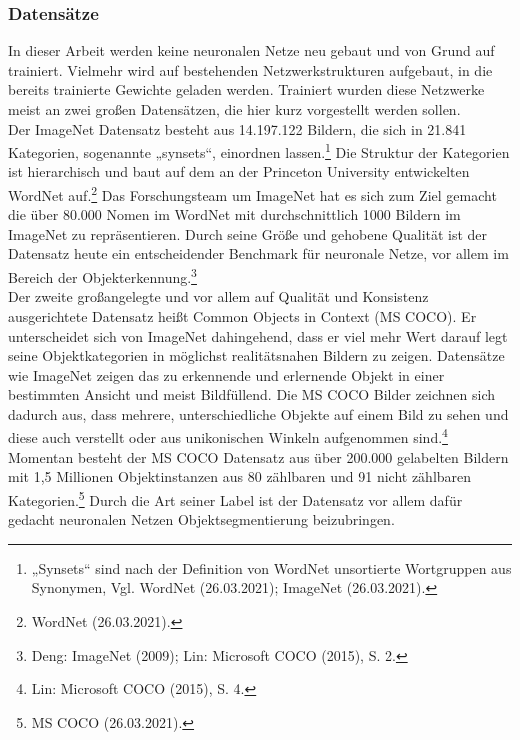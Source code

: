 \documentclass[a4paper,12pt,ngerman]{article}
\begin{document}
\subsubsection{Datensätze}
In dieser Arbeit werden keine neuronalen Netze neu gebaut und von Grund auf trainiert. Vielmehr wird auf bestehenden Netzwerkstrukturen aufgebaut, in die bereits trainierte Gewichte geladen werden. Trainiert wurden diese Netzwerke meist an zwei großen Datensätzen, die hier kurz vorgestellt werden sollen. \\
Der ImageNet Datensatz besteht aus 14.197.122 Bildern, die sich in 21.841 Kategorien, sogenannte „synsets“, einordnen lassen.\footnote{„Synsets“ sind nach der Definition von WordNet unsortierte Wortgruppen aus Synonymen, Vgl. WordNet (26.03.2021); ImageNet (26.03.2021).}  Die Struktur der Kategorien ist hierarchisch und baut auf dem an der Princeton University entwickelten WordNet auf.\footnote{WordNet (26.03.2021).}  Das Forschungsteam um ImageNet hat es sich zum Ziel gemacht die über 80.000 Nomen im WordNet mit durchschnittlich 1000 Bildern im ImageNet zu repräsentieren. Durch seine Größe und gehobene Qualität ist der Datensatz heute ein entscheidender Benchmark für neuronale Netze, vor allem im Bereich der Objekterkennung.\footnote{Deng: ImageNet (2009); Lin: Microsoft COCO (2015), S. 2.} \\
Der zweite großangelegte und vor allem auf Qualität und Konsistenz ausgerichtete Datensatz heißt Common Objects in Context (MS COCO). Er unterscheidet sich von ImageNet dahingehend, dass er viel mehr Wert darauf legt seine Objektkategorien in möglichst realitätsnahen Bildern zu zeigen. Datensätze wie ImageNet zeigen das zu erkennende und erlernende Objekt in einer bestimmten Ansicht und meist Bildfüllend. Die MS COCO Bilder zeichnen sich dadurch aus, dass mehrere, unterschiedliche Objekte auf einem Bild zu sehen und diese auch verstellt oder aus unikonischen Winkeln aufgenommen sind.\footnote{Lin: Microsoft COCO (2015), S. 4.} \\
Momentan besteht der MS COCO Datensatz aus über 200.000 gelabelten Bildern mit 1,5 Millionen Objektinstanzen aus 80 zählbaren und 91 nicht zählbaren Kategorien.\footnote{MS COCO (26.03.2021).} Durch die Art seiner Label ist der Datensatz vor allem dafür gedacht neuronalen Netzen Objektsegmentierung beizubringen.
\end{document}
